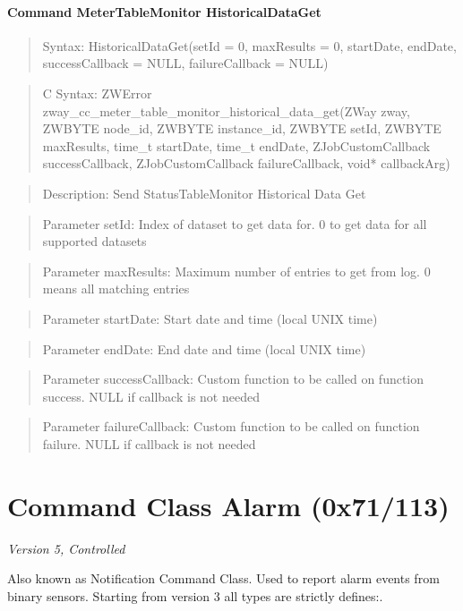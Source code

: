 \paragraph{Command MeterTableMonitor HistoricalDataGet}
\begin{quote}Syntax: HistoricalDataGet(setId = 0, maxResults = 0, startDate, endDate, successCallback = NULL, failureCallback = NULL)\end{quote}
\begin{quote}C Syntax: ZWError zway\_cc\_meter\_table\_monitor\_historical\_data\_get(ZWay zway, ZWBYTE node\_id, ZWBYTE instance\_id, ZWBYTE setId, ZWBYTE maxResults, time\_t startDate, time\_t endDate, ZJobCustomCallback successCallback, ZJobCustomCallback failureCallback, void* callbackArg)\end{quote}
\begin{quote}Description: Send StatusTableMonitor Historical Data Get\end{quote}
\begin{quote}Parameter setId: Index of dataset to get data for. 0 to get data for all supported datasets\end{quote}
\begin{quote}Parameter maxResults: Maximum number of entries to get from log. 0 means all matching entries\end{quote}
\begin{quote}Parameter startDate: Start date and time (local UNIX time)\end{quote}
\begin{quote}Parameter endDate: End date and time (local UNIX time)\end{quote}
\begin{quote}Parameter successCallback: Custom function to be called on function success. NULL if callback is not needed\end{quote}
\begin{quote}Parameter failureCallback: Custom function to be called on function failure. NULL if callback is not needed\end{quote}



\section{Command Class Alarm (0x71/113)}

\textit{Version 5, Controlled}
\newline

Also known as Notification Command Class. Used to report alarm events from binary sensors. Starting from version 3 all types are strictly defines:. 

